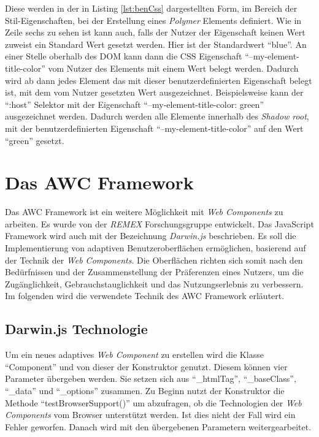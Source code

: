 \documentclass[12pt, paper=a4, bibtotoc, toc=listof, headsepline=true]{scrreprt}
\begin{document}
Diese werden in der in Listing \ref{lst:benCss} dargestellten Form, im Bereich der Stil-Eigenschaften, bei der Erstellung eines \emph{Polymer} Elements definiert. Wie in Zeile sechs zu sehen ist kann auch, falls der Nutzer der Eigenschaft keinen Wert zuweist ein Standard Wert gesetzt werden. Hier ist der Standardwert \enquote{blue}. An einer Stelle oberhalb des \ac{DOM} kann dann die \ac{CSS} Eigenschaft \enquote{--my-element-title-color} vom Nutzer des Elements mit einem Wert belegt werden. Dadurch wird ab dann jedes Element das mit dieser benutzerdefinierten Eigenschaft belegt ist, mit dem vom Nutzer gesetzten Wert ausgezeichnet. Beispielsweise kann der \enquote{:host} Selektor mit der Eigenschaft \enquote{--my-element-title-color: green} ausgezeichnet werden. Dadurch werden alle Elemente innerhalb des \emph{Shadow root}, mit der benutzerdefinierten Eigenschaft \enquote{--my-element-title-color} auf den Wert \enquote{green} gesetzt.
\chapter{Das AWC Framework}	
Das \ac{AWC Framework} ist ein weitere Möglichkeit mit \emph{Web Components} zu arbeiten. Es wurde von der \emph{REMEX} Forschungsgruppe entwickelt. Das JavaScript Framework wird auch mit der Bezeichnung \emph{Darwin.js} beschrieben. Es soll die Implementierung von adaptiven Benutzeroberflächen ermöglichen, basierend auf der Technik der \emph{Web Components}. Die Oberflächen richten sich somit nach den Bedürfnissen und der Zusammenstellung der Präferenzen eines Nutzers, um die Zugänglichkeit, Gebrauchstauglichkeit und das Nutzungserlebnis zu verbessern\cite{gitHubAwc}\cite{darwin}. Im folgenden wird die verwendete Technik des \ac{AWC Framework} erläutert. 
\section{Darwin.js Technologie}
Um ein neues adaptives \emph{Web Component} zu erstellen wird die Klasse \enquote{Component} und von dieser der Konstruktor genutzt. Diesem können vier Parameter übergeben werden. Sie setzen sich aus \enquote{\_htmlTag}, \enquote{\_baseClass}, \enquote{\_data} und \enquote{\_options} zusammen. Zu Beginn nutzt der Konstruktor die Methode \enquote{testBrowserSupport()} um abzufragen, ob die Technologien der \emph{Web Components} vom Browser unterstützt werden. Ist dies nicht der Fall wird ein Fehler geworfen. Danach wird mit den übergebenen Parametern weitergearbeitet.
\end{document}
